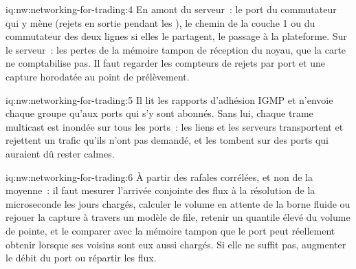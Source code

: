 \begin{solution}{iq:nw:networking-for-trading:4}
En amont du serveur~: le port du commutateur qui y mène (rejets en sortie pendant les ), le chemin de la couche 1 ou du commutateur des deux lignes
si elles le partagent, le passage à la plateforme. Sur le serveur~: les pertes de la mémoire tampon de réception du noyau, que la carte ne comptabilise pas. Il faut regarder
les compteurs de rejets par port et une capture horodatée au point de prélèvement.
\end{solution}

\begin{solution}{iq:nw:networking-for-trading:5}
Il lit les rapports d'adhésion IGMP et n'envoie chaque groupe qu'aux ports qui s'y sont abonnés. Sans lui, chaque trame multicast est
inondée sur tous les ports~: les liens et les serveurs transportent et rejettent un trafic qu'ils n'ont pas demandé, et les  tombent sur des ports qui
auraient dû rester calmes.
\end{solution}

\begin{solution}{iq:nw:networking-for-trading:6}
À partir des rafales corrélées, et non de la moyenne~: il faut mesurer l'arrivée conjointe des flux à la résolution de la microseconde les jours chargés, calculer le
volume en attente de la borne fluide ou rejouer la capture à travers un modèle de file, retenir un quantile élevé du volume de pointe, et le comparer
avec la mémoire tampon que le port peut réellement obtenir lorsque ses voisins sont eux aussi chargés. Si elle ne suffit pas, augmenter le débit du port ou répartir
les flux.
\end{solution}
